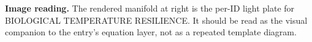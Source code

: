 \begin{samepage}
\noindent\begin{minipage}[t]{0.45\linewidth}
\vspace{0pt}
\raggedright
\scriptsize\textbf{Image reading.} The rendered manifold at right is the per-ID light plate for BIOLOGICAL TEMPERATURE RESILIENCE. It should be read as the visual companion to the entry's equation layer, not as a repeated template diagram.\par
\end{minipage}\hfill
\begin{minipage}[t]{0.53\linewidth}
\vspace*{-0.10in}
\raggedright
{}
\end{minipage}
\end{samepage}

\clearpage


